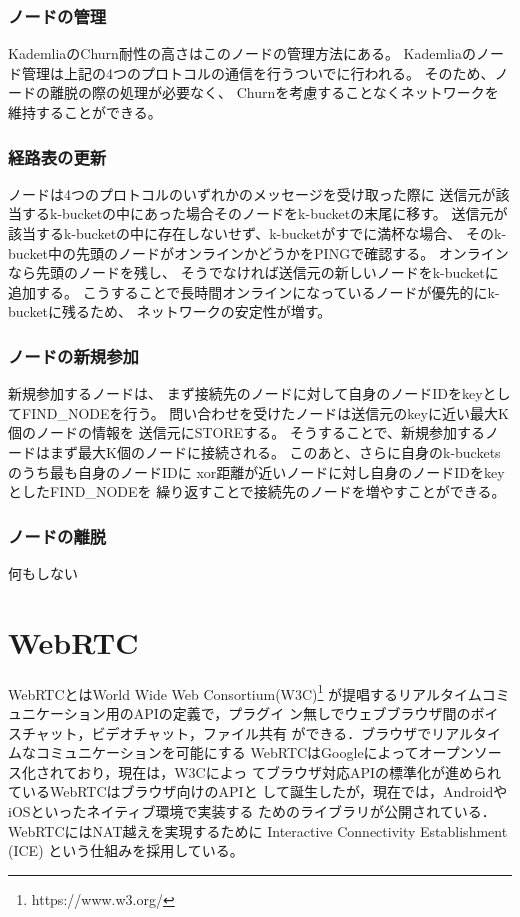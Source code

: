 \documentclass[sotsuron]{jcsie}
\begin{document}
\subsubsection{ノードの管理}
KademliaのChurn耐性の高さはこのノードの管理方法にある。
Kademliaのノード管理は上記の4つのプロトコルの通信を行うついでに行われる。
そのため、ノードの離脱の際の処理が必要なく、
Churnを考慮することなくネットワークを維持することができる。
\subsubsection{経路表の更新}
ノードは4つのプロトコルのいずれかのメッセージを受け取った際に
送信元が該当するk-bucketの中にあった場合そのノードをk-bucketの末尾に移す。
送信元が該当するk-bucketの中に存在しないせず、k-bucketがすでに満杯な場合、
そのk-bucket中の先頭のノードがオンラインかどうかをPINGで確認する。
オンラインなら先頭のノードを残し、
そうでなければ送信元の新しいノードをk-bucketに追加する。
こうすることで長時間オンラインになっているノードが優先的にk-bucketに残るため、
ネットワークの安定性が増す。
\subsubsection{ノードの新規参加}
新規参加するノードは、
まず接続先のノードに対して自身のノードIDをkeyとしてFIND\_NODEを行う。
問い合わせを受けたノードは送信元のkeyに近い最大K個のノードの情報を
送信元にSTOREする。
そうすることで、新規参加するノードはまず最大K個のノードに接続される。
このあと、さらに自身のk-bucketsのうち最も自身のノードIDに
xor距離が近いノードに対し自身のノードIDをkeyとしたFIND\_NODEを
繰り返すことで接続先のノードを増やすことができる。
\subsubsection{ノードの離脱}
何もしない

\section{WebRTC}
WebRTCとはWorld Wide Web Consortium(W3C)\footnote{https://www.w3.org/}
が提唱するリアルタイムコミュニケーション用のAPIの定義で，プラグイ
ン無しでウェブブラウザ間のボイスチャット，ビデオチャット，ファイル共有
ができる．ブラウザでリアルタイムなコミュニケーションを可能にする
WebRTCはGoogleによってオープンソース化されており，現在は，W3Cによっ
てブラウザ対応APIの標準化が進められているWebRTCはブラウザ向けのAPIと
して誕生したが，現在では，AndroidやiOSといったネイティブ環境で実装する
ためのライブラリが公開されている．WebRTCにはNAT越えを実現するために
Interactive Connectivity Establishment (ICE)\cite{rosenberg2010interactive}
という仕組みを採用している。
\end{document}
